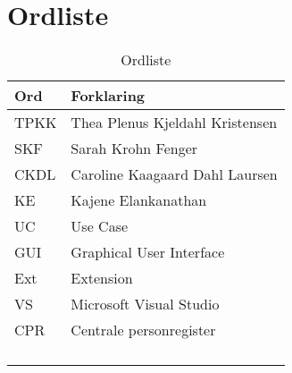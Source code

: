 \chapter{Ordliste}

\begin{table}[h!]
	\begin{tabular}{l|l}
		\textbf{Ord} & \textbf {Forklaring} \\ 
		\hline
		TPKK & Thea Plenus Kjeldahl Kristensen \\
		\hline
		SKF & Sarah Krohn Fenger \\
		\hline
		CKDL & Caroline Kaagaard Dahl Laursen \\
		\hline
		KE & Kajene Elankanathan \\
		\hline
		UC & Use Case \\
		\hline
		GUI & Graphical User Interface \\
		\hline
		Ext & Extension \\
		\hline
		VS & Microsoft Visual Studio \\
		\hline
		CPR & Centrale personregister \\
		\hline
		 &  \\
		\hline
		 &  \\
		\hline
		 &  \\
		\hline
		 &  \\
		\hline
	\end{tabular}
	\caption{Ordliste}
	\label{table:Ordliste}
\end{table}

\clearpage
